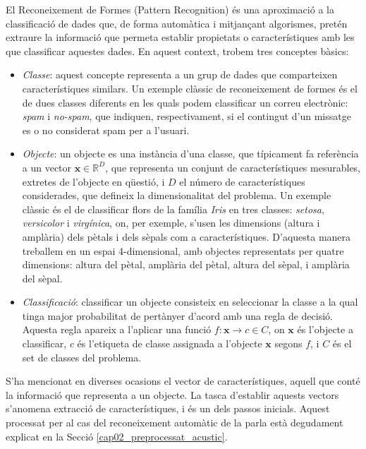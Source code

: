 El Reconeixement de Formes (Pattern Recognition) és una aproximació a la classificació de dades que, de forma automàtica i mitjançant algorismes, pretén extraure la informació que permeta establir propietats o característiques amb les que classificar aquestes dades.
En aquest context, trobem tres conceptes bàsics:
\begin{itemize}
    \item \emph{Classe}: aquest concepte representa a un grup de dades que comparteixen característiques similars. Un exemple clàssic de reconeixement de formes és el de dues classes diferents en les quals podem classificar un correu electrònic: \emph{spam} i \emph{no-spam}, que indiquen, respectivament, si el contingut d'un missatge es o no considerat spam per a l'usuari.
    
    \item \emph{Objecte}: un objecte es una instància d'una classe, que típicament fa referència a un vector $\textbf{x} \in \mathbb{R}^D$, que representa un conjunt de característiques mesurables, extretes de l'objecte en qüestió, i $D$ el número de característiques considerades, que defineix la dimensionalitat del problema.
    Un exemple clàssic és el de classificar flors de la família \textit{Iris} en tres classes: \emph{setosa}, \emph{versicolor} i \emph{virgínica}, on, per exemple, s'usen les dimensions (altura i amplària) dels pètals i dels sèpals com a característiques.
    D'aquesta manera treballem en un espai 4-dimensional, amb objectes representats per quatre dimensions: altura del pètal, amplària del pètal, altura del sèpal, i amplària del sèpal.
    
    \item \emph{Classificació}: classificar un objecte consisteix en seleccionar la classe a la qual tinga major probabilitat de pertànyer d'acord amb una regla de decisió. Aquesta regla apareix a l'aplicar una funció $f \colon \textbf{x} \to c \in C$, on $\textbf{x}$ és l'objecte a classificar, $c$ és l'etiqueta de classe assignada a l'objecte $\textbf{x}$ segons $f$, i $C$ és el set de classes del problema.
\end{itemize}

S'ha mencionat en diverses ocasions el vector de característiques, aquell que conté la informació que representa a un objecte. La tasca d'establir aquests vectors s'anomena extracció de característiques, i és un dels passos inicials.
Aquest processat per al cas del reconeixement automàtic de la parla està degudament explicat en la Secció \ref{cap02_preprocessat_acustic}.

